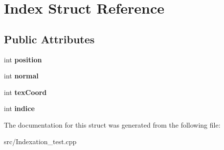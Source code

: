 \hypertarget{struct_index}{}\section{Index Struct Reference}
\label{struct_index}
\subsection*{Public Attributes}
\begin{DoxyCompactItemize}
\item 
\mbox{\label{struct_index_a19da745bad3ef10f056deb1d5c847977}} 
int {\bfseries position}
\item 
\mbox{\label{struct_index_a426230d3d71ced90862af80a6beabcf3}} 
int {\bfseries normal}
\item 
\mbox{\label{struct_index_ae033ccddebcd55920d047fdb180ed6ff}} 
int {\bfseries tex\+Coord}
\item 
\mbox{\label{struct_index_a070fb177b4763f7e90f175c7784d81ee}} 
int {\bfseries indice}
\end{DoxyCompactItemize}


The documentation for this struct was generated from the following file\+:\begin{DoxyCompactItemize}
\item 
src/Indexation\+\_\+test.\+cpp\end{DoxyCompactItemize}
